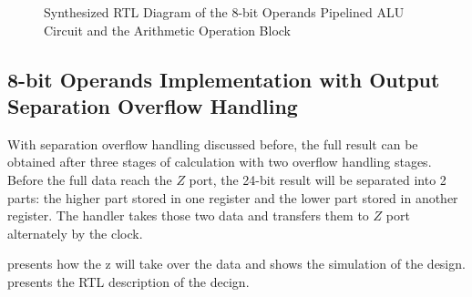 \begin{figure}[!ht]
	\centering
	\caption{Synthesized RTL Diagram of the 8-bit Operands Pipelined ALU Circuit and the Arithmetic Operation Block}

	\hspace{0.5cm}
	\label{fig:p_8_rtl}
\end{figure}

\subsection{8-bit Operands Implementation with Output Separation Overflow Handling}

With separation overflow handling discussed before, the full result can be obtained after three stages of calculation with two overflow handling stages.
Before the full data reach the \(Z\) port, the 24-bit result will be separated into 2 parts: the higher part stored in one register and the lower part stored in another register.
The handler takes those two data and transfers them to \(Z\) port alternately by the clock.

 presents how the z will take over the data and  shows the simulation of the design.
 presents the RTL description of the decign.

\clearpage

